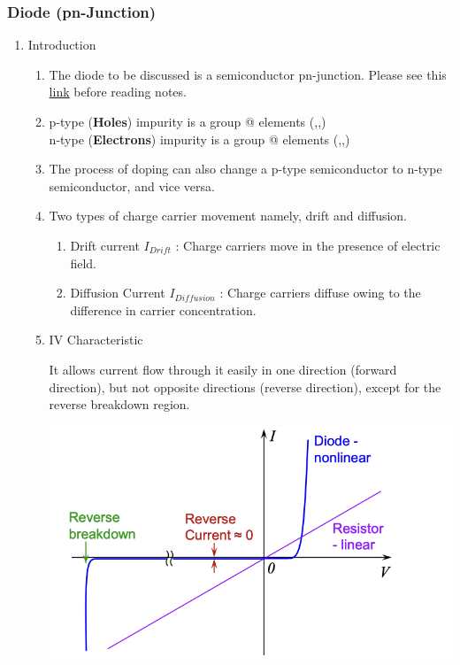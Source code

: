 \documentclass{article}
\makeatletter
\newcommand*{\rom}[1]{\expandafter\@slowromancap\romannumeral #1@}
\makeatother
\begin{document}
\subsubsection{Diode (pn-Junction)}
\begin{enumerate}
    \item Introduction
    \begin{enumerate}
        \item The diode to be discussed is a semiconductor pn-junction. Please see this \href{https://www.youtube.com/watch?v=Fwj_d3uO5g8}{link} before reading notes.
        \item p-type (\textbf{Holes}) impurity is a group \rom{3} elements (,,)\\
        n-type (\textbf{Electrons}) impurity is a group \rom{5} elements (,,)
        \item The process of doping can also change a p-type semiconductor to n-type semiconductor, and vice versa.
        \item Two types of charge carrier movement namely, drift and diffusion.
        \begin{enumerate}
            \item Drift current $I_{Drift}$ : Charge carriers move in the presence of electric field.
            \item Diffusion Current $I_{Diffusion}$ : Charge carriers diffuse owing to the difference in carrier concentration.
        \end{enumerate}
        \item IV Characteristic\\
            \begin{minipage}{0.4\textwidth}
            It allows current flow through it easily in one direction (forward direction), but not opposite directions (reverse direction), except for the reverse breakdown region.
            \end{minipage}
            \begin{minipage}{0.6\textwidth}
                \includegraphics[width=1\linewidth]{image/pnchar.png}

\end{minipage}
\end{enumerate}
\end{enumerate}
\end{document}
